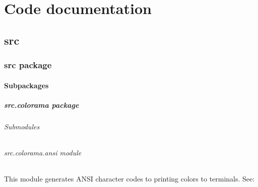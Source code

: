 \documentclass[a4paper,10pt,english]{sphinxmanual}
\begin{document}
\chapter{Code documentation}
\label{\detokenize{index:code-documentation}}

\section{src}
\label{\detokenize{apidoc_src/modules:src}}\label{\detokenize{apidoc_src/modules::doc}}

\subsection{src package}
\label{\detokenize{apidoc_src/src::doc}}\label{\detokenize{apidoc_src/src:src-package}}

\subsubsection{Subpackages}
\label{\detokenize{apidoc_src/src:subpackages}}

\paragraph{src.colorama package}
\label{\detokenize{apidoc_src/src.colorama:src-colorama-package}}\label{\detokenize{apidoc_src/src.colorama::doc}}

\subparagraph{Submodules}
\label{\detokenize{apidoc_src/src.colorama:submodules}}

\subparagraph{src.colorama.ansi module}
\label{\detokenize{apidoc_src/src.colorama:module-src.colorama.ansi}}\label{\detokenize{apidoc_src/src.colorama:src-colorama-ansi-module}}
This module generates ANSI character codes to printing colors to terminals.
See: 
\end{document}
